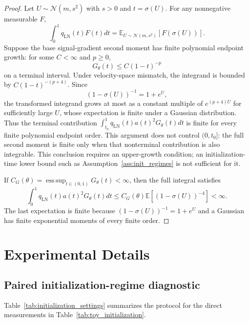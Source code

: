 \documentclass{article}
\theoremstyle{plain}
\theoremstyle{definition}
\theoremstyle{remark}
\newcommand{\Ex}{\mathbb{E}}
\begin{document}
\begin{proof}
Let $U\sim\mathcal N(m,s^2)$ with $s>0$ and $t=\sigma(U)$. For any nonnegative measurable $F$,
\begin{equation}
\int_0^1q_{\mathrm{LN}}(t)F(t)dt
=\Ex_{U\sim\mathcal N(m,s^2)}[F(\sigma(U))].
\end{equation}
Suppose the base signal-gradient second moment has finite polynomial endpoint growth: for some $C<\infty$ and $p\ge0$,
\begin{equation}
G_\theta(t)\le C(1-t)^{-p}
\end{equation}
on a terminal interval. Under velocity-space mismatch, the integrand is bounded by $C(1-t)^{-(p+4)}$. Since
\begin{equation}
(1-\sigma(U))^{-1}=1+e^U,
\end{equation}
the transformed integrand grows at most as a constant multiple of $e^{(p+4)U}$ for sufficiently large $U$, whose expectation is finite under a Gaussian distribution. Thus the terminal contribution $\int_{t_0}^1q_{\mathrm{LN}}(t)a(t)^2G_\theta(t)dt$ is finite for every finite polynomial endpoint order. This argument does not control $(0,t_0]$: the full second moment is finite only when that nonterminal contribution is also integrable. This conclusion requires an upper-growth condition; an initialization-time lower bound such as Assumption~\ref{ass:init_regimes} is not sufficient for it.

If $C_G(\theta)=\operatorname*{ess\,sup}_{t\in(0,1)}G_\theta(t)<\infty$, then the full integral satisfies
\begin{equation}
\int_0^1q_{\mathrm{LN}}(t)a(t)^2G_\theta(t)dt
\le C_G(\theta)\Ex\left[(1-\sigma(U))^{-4}\right]<\infty.
\end{equation}
The last expectation is finite because $(1-\sigma(U))^{-1}=1+e^U$ and a Gaussian has finite exponential moments of every finite order.
\end{proof}

\section{Experimental Details}
\label{app:experimental_details}

\subsection{Paired initialization-regime diagnostic}
\label{app:toy_initialization}

Table~\ref{tab:initialization_settings} summarizes the protocol for the direct measurements in Table~\ref{tab:toy_initialization}.
\end{document}
